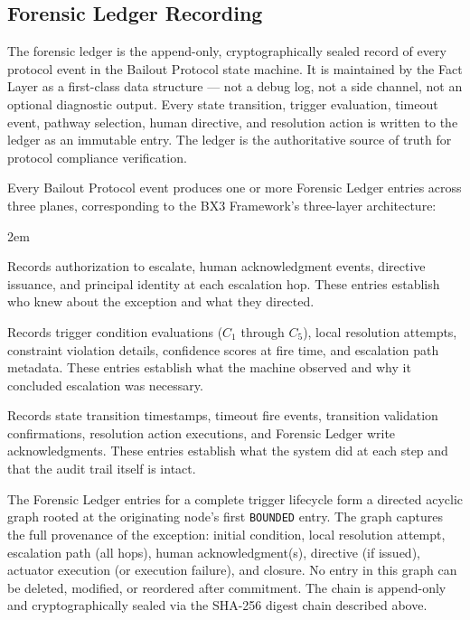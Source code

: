 \subsection{Forensic Ledger Recording}
\label{sec:forensic-ledger}

The forensic ledger is the append-only, cryptographically sealed record of every
protocol event in the Bailout Protocol state machine. It is maintained by the Fact
Layer as a first-class data structure — not a debug log, not a side channel, not an
optional diagnostic output. Every state transition, trigger evaluation, timeout
event, pathway selection, human directive, and resolution action is written to the
ledger as an immutable entry. The ledger is the authoritative source of truth for
protocol compliance verification.

Every Bailout Protocol event produces one or more Forensic Ledger entries across
three planes, corresponding to the BX3 Framework's three-layer architecture:

\begin{trivlist}\itemindent2em
\item[\textbf{Purpose Plane}] Records authorization to escalate, human acknowledgment
  events, directive issuance, and principal identity at each escalation hop. These
  entries establish who knew about the exception and what they directed.

\item[\textbf{Bounds Engine Plane}] Records trigger condition evaluations ($C_1$
  through $C_5$), local resolution attempts, constraint violation details,
  confidence scores at fire time, and escalation path metadata. These entries
  establish what the machine observed and why it concluded escalation was necessary.

\item[\textbf{Fact Plane}] Records state transition timestamps, timeout fire events,
  transition validation confirmations, resolution action executions, and Forensic
  Ledger write acknowledgments. These entries establish what the system did at each
  step and that the audit trail itself is intact.
\end{trivlist}

The Forensic Ledger entries for a complete trigger lifecycle form a directed acyclic
graph rooted at the originating node's first \texttt{BOUNDED} entry. The graph
captures the full provenance of the exception: initial condition, local resolution
attempt, escalation path (all hops), human acknowledgment(s), directive (if issued),
actuator execution (or execution failure), and closure. No entry in this graph can
be deleted, modified, or reordered after commitment. The chain is append-only and
cryptographically sealed via the SHA-256 digest chain described above.

